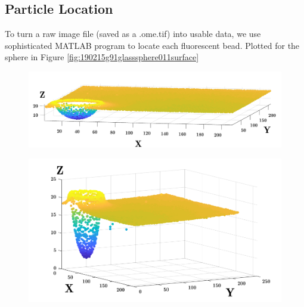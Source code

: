 \subsection{Particle Location}
To turn a raw image file (saved as a .ome.tif) into usable data, we use sophisticated MATLAB program to locate each fluorescent bead. Plotted for the sphere in Figure \ref{fig:190215g91glasssphere011surface}
\begin{figure}[h!]
	\centering
	\includegraphics[width=\linewidth]{Chapters/Figures/sphere011_ia/particle_located_normalized}
	\caption[Particle Located: Normalized-Axes]{}
	\caption{}
	\label{fig:particlelocatednormalized}
\end{figure}
\begin{figure}[h!]
	\centering
	\includegraphics[width=\linewidth]{Chapters/Figures/sphere011_ia/particle_located_stretched}
	\caption[Particle Located: Stretched-Axes]{}
	\caption{}
	\label{fig:particlelocatedstretched}
\end{figure}



